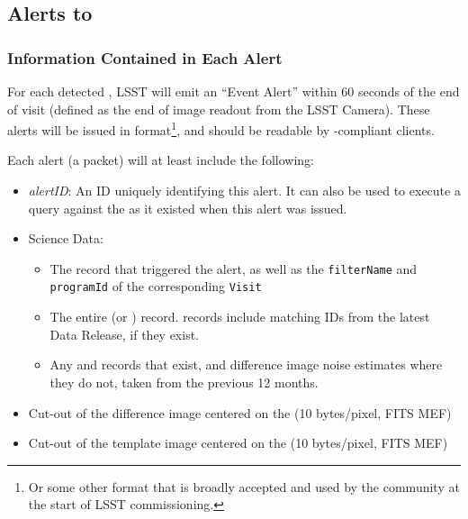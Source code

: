 \subsection{Alerts to \DIASources}
\label{sec:voEventContents}

\subsubsection{Information Contained in Each Alert}

For each detected \DIASource, LSST will emit an ``Event Alert'' within 60 seconds of the end of visit (defined as the end of image readout from the LSST Camera). These alerts will be issued in \VOEvent format\footnote{Or some other format that is broadly accepted and used by the community at the start of LSST commissioning.}, and should be readable by \VOEvent-compliant clients.

Each alert (a \VOEvent packet) will at least include the following:

\begin{itemize}
    \item \emph{alertID}: An ID uniquely identifying this alert. It can also be used to execute a query against the \PPDB as it existed when this alert was issued.
    \item Science Data:
    \begin{itemize}
        \item The \DIASource record that triggered the alert, as well as the \texttt{filterName} and \texttt{programId} of the corresponding \texttt{Visit}
	\item The entire \DIAObject (or \SSObject) record. \DIAObject records include matching \Object IDs from the latest Data Release, if they exist.
	\item Any \DIASource and \DIAForcedSource records that exist, and difference image noise estimates where they do not, taken from the previous 12 months. 
    \end{itemize}
    \item Cut-out of the difference image centered on the \DIASource (10 bytes/pixel, FITS MEF)
    \item Cut-out of the template image centered on the \DIASource (10 bytes/pixel, FITS MEF)
\end{itemize}

